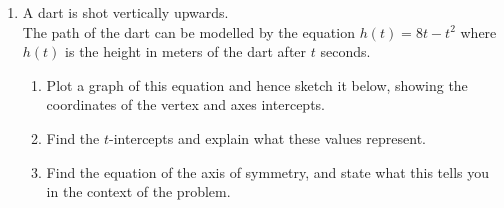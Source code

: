\documentclass[12pt, twoside]{article}
\begin{document}
\begin{enumerate}
\newpage


\newpage
\item A dart is shot vertically upwards.\\[0.25cm]
The path of the dart can be modelled by the equation $h(t)=8t-t^2$ where $h(t)$ is the height in meters of the dart after $t$ seconds.
    \begin{enumerate}
        \item Plot a graph of this equation and hence sketch it below, showing the coordinates of the vertex and axes intercepts.
        \item Find the $t$-intercepts and explain what these values represent. \vspace{2cm}
        \item Find the equation of the axis of symmetry, and state what this tells you in the context of the problem. \vspace{2cm}
    \end{enumerate}
    \begin{center}
    \end{center}

\end{enumerate}
\end{document}
